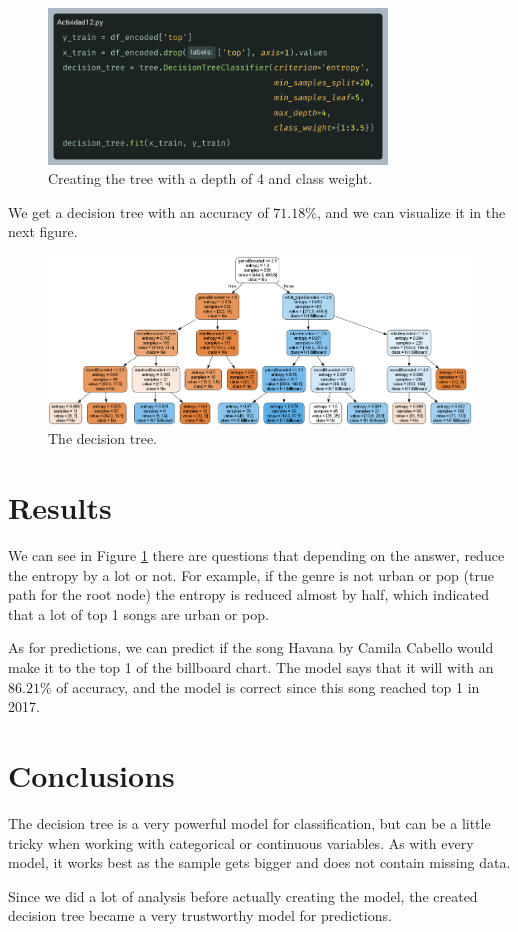 \documentclass[10pt]{article}
\begin{document}
\begin{figure}[h]
    \centering
    \includegraphics[width=90mm]{2025-03-31-07-47-28.png}
    \caption{Creating the tree with a depth of 4 and class weight.}
\end{figure}
We get a decision tree with an accuracy of $71.18\%$, and we can visualize it in the next figure.
\begin{figure}[h]
    \centering
    \includegraphics[width=120mm]{tree1.dot.png}
    \caption{The decision tree.}
    \label{fig:tree}
\end{figure}

\section{Results}
We can see in Figure \ref{fig:tree} there are questions that depending on the answer, reduce the entropy by a lot or not. For example, if the genre is not urban or pop (true path for the root node) the entropy is reduced almost by half, which indicated that a lot of top 1 songs are urban or pop. \par
As for predictions, we can predict if the song Havana by Camila Cabello would make it to the top 1 of the billboard chart. The model says that it will with an $86.21\%$ of accuracy, and the model is correct since this song reached top 1 in 2017.

\section{Conclusions}
The decision tree is a very powerful model for classification, but can be a little tricky when working with categorical or continuous variables. As with every model, it works best as the sample gets bigger and does not contain missing data. \par
Since we did a lot of analysis before actually creating the model, the created decision tree became a very trustworthy model for predictions.



\end{document}
